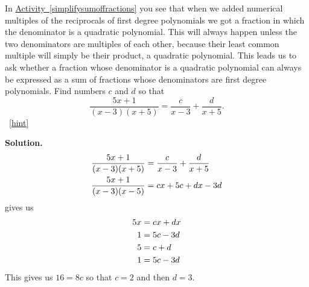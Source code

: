 \documentclass{book}
\begin{document}
\setcounter{project}{264}
\addtocounter{project}{-1}
\begin{activity}[]\label{partialfractionsintro}
\hypertarget{p-1422}{}%
In \hyperref[simplifysumoffractions]{Activity~\ref{simplifysumoffractions}} you see that when we added numerical multiples of the reciprocals of first degree polynomials we got a fraction in which the denominator is a quadratic polynomial. This will always happen unless the two denominators are multiples of each other, because their least common multiple will simply be their product, a quadratic polynomial. This leads us to ask whether a fraction whose denominator is a quadratic polynomial can always be expressed as a sum of fractions whose denominators are first degree polynomials. Find numbers \(c\) and \(d\) so that%
\begin{equation*}
\frac{5x+1}{(x-3)(x+5)} = \frac{c}{x-3} + \frac{d}{x+5}.
\end{equation*}
%
~\hfill{\tiny\hyperlink{a-264}{[hint]}\hypertarget{q-264}{}}\par\smallskip%
\noindent\textbf{Solution.}\hypertarget{solution-201}{}\quad%
\hypertarget{p-1424}{}%
%
\begin{align*}
\frac{5x+1}{(x-3)(x+5)}  &=  \frac{c}{x-3} + \frac{d}{x+5}\\
\frac{5x+1}{(x-3)(x-5)}  &= cx+5c+dx-3d
\end{align*}
gives us%
\begin{align*}
5x &= cx+dx\\
1 &= 5c-3d\\
5 &= c+d\\
1 &= 5c-3d
\end{align*}
This gives us \(16=8c\) so that \(c=2\) and then \(d=3\).%
\end{activity}
\end{document}
